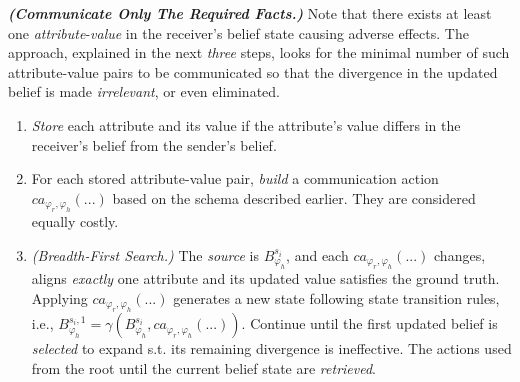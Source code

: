 \documentclass[letterpaper]{article} %
\begin{document}
\noindent \textit{\textbf{(Communicate Only The Required Facts.)}}
Note that there exists at least one \textit{attribute}-\textit{value} in the receiver's belief state causing adverse effects. 
The approach, explained in the next \textit{three} steps, looks for the minimal number of such attribute-value pairs to be communicated so that
the divergence in the updated belief is made \textit{irrelevant}, or even eliminated.
\begin{enumerate}
    \item 
    \textit{Store} each attribute and its value if the attribute's value differs in the receiver's belief from the sender's belief. 

    \item For each stored attribute-value pair, \textit{build} a communication action $ca_{\varphi_r, \varphi_h}(...)$ based on the schema described earlier. They are considered equally costly.
    
    \item 
    \textit{(Breadth-First Search.)} 
    The \textit{source} is $B_{\varphi_h}^{s_i}$, and each $ca_{\varphi_r, \varphi_h}(...)$ changes, aligns \textit{exactly} one attribute and its updated value satisfies the ground truth. 
    Applying $ca_{\varphi_r, \varphi_h}(...)$ generates a new state following state transition rules, i.e., $B_{\varphi_h}^{s_i,1} = \gamma(B_{\varphi_h}^{s_i}, ca_{\varphi_r, \varphi_h}(...))$.
    Continue until the first updated belief is \textit{selected} to expand s.t. its remaining divergence is ineffective. The actions used from the root until the current belief state are \textit{retrieved}.
\end{enumerate}
\end{document}

